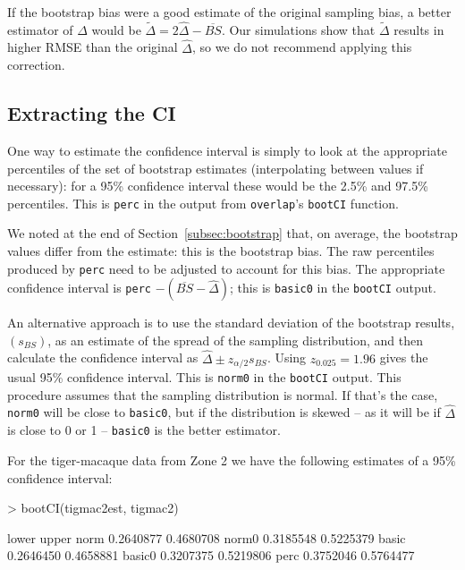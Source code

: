 \documentclass[a4paper]{article}
\begin{document}
If the bootstrap bias were a good estimate of the original sampling bias, a better estimator of $\Delta$ would be $\tilde{\Delta} = 2\hat{\Delta} - \overline{BS}$. Our simulations show that $\tilde{\Delta}$ results in higher RMSE than the original $\hat{\Delta}$, so we do not recommend applying this correction.

\subsection{Extracting the CI}
\label{subsec:extract}

One way to estimate the confidence interval is simply to look at the appropriate percentiles of the set of bootstrap estimates (interpolating between values if necessary): for a 95\% confidence interval these would be the 2.5\% and 97.5\% percentiles. This is \texttt{perc} in the output from \texttt{overlap}'s \texttt{bootCI} function.

We noted at the end of Section~\ref{subsec:bootstrap} that, on average, the bootstrap values differ from the estimate: this is the bootstrap bias. The raw percentiles produced by \texttt{perc} need to be adjusted to account for this bias. The appropriate confidence interval is \texttt{perc} $- (\overline{BS} - \hat{\Delta})$; this is \texttt{basic0} in the \texttt{bootCI} output.

An alternative approach is to use the standard deviation of the bootstrap results, $(s_{\scriptscriptstyle BS})$, as an estimate of the spread of the sampling distribution, and then calculate the confidence interval as $\hat{\Delta} \pm z_{{\alpha}/2} s_{\scriptscriptstyle BS}$. Using $z_{0.025} = 1.96$ gives the usual 95\% confidence interval. This is \texttt{norm0} in the \texttt{bootCI} output. This procedure assumes that the sampling distribution is normal. If that's the case, \texttt{norm0} will be close to \texttt{basic0}, but if the distribution is skewed -- as it will be if $\hat{\Delta}$ is close to 0 or 1 -- \texttt{basic0} is the better estimator.

For the tiger-macaque data from Zone 2 we have the following estimates of a 95\% confidence interval:

\begin{Schunk}
\begin{Sinput}
> bootCI(tigmac2est, tigmac2)
\end{Sinput}
\begin{Soutput}
           lower     upper
norm   0.2640877 0.4680708
norm0  0.3185548 0.5225379
basic  0.2646450 0.4658881
basic0 0.3207375 0.5219806
perc   0.3752046 0.5764477
\end{Soutput}
\end{Schunk}
\end{document}
